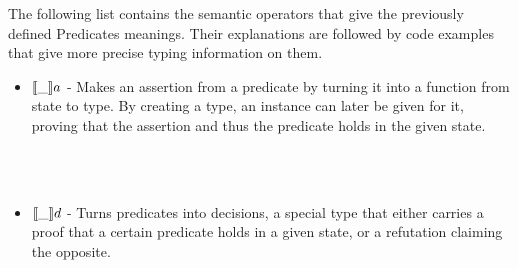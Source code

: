 The following list contains the semantic operators that give the previously defined Predicates meanings. Their explanations are followed by code examples that give more precise typing information on them.
\begin{itemize}
    \item $\llbracket \_ \rrbracket a$ - Makes an assertion from a predicate by turning it into a function from state to type. By creating a type, an instance can later be given for it, proving that the assertion and thus the predicate holds in the given state.
    \begin{code}
        \>[2]\AgdaSpace{}%
        \AgdaSymbol{:}\AgdaSpace{}%
        \<%
        \\
        \>[2]\AgdaSpace{}%
        \AgdaSymbol{=}\AgdaSpace{}%
        \AgdaSpace{}%
        \AgdaSpace{}%
        \<%
        \\
        \>[2]\AgdaSpace{}%
        \AgdaSymbol{:}\AgdaSpace{}%
        \AgdaSpace{}%
        \AgdaSpace{}%
        \<%
    \end{code}

    \item $\llbracket \_ \rrbracket d$ - Turns predicates into decisions, a special type that either carries a proof that a certain predicate holds in a given state, or a refutation claiming the opposite.
    \begin{code}
        \>[2]\AgdaSpace{}%
        \AgdaSymbol{:}\AgdaSpace{}%
        \AgdaSpace{}%
        \AgdaSpace{}%
        \<%
        \\
        \>[2]\AgdaSpace{}%
        \AgdaSpace{}%
        \AgdaSymbol{=}\AgdaSpace{}%
        \AgdaSymbol{(}\AgdaSpace{}%
        \AgdaSymbol{:}\AgdaSpace{}%
        \AgdaSymbol{)}\AgdaSpace{}%
        \AgdaSpace{}%
        \AgdaSpace{}%
        \AgdaSymbol{(}\AgdaSpace{}%
        \AgdaSpace{}%
        \AgdaSpace{}%
        \AgdaSymbol{)}\<%
        \\
        \>[2]\AgdaSpace{}%
        \AgdaSymbol{:}\AgdaSpace{}%
        \AgdaSymbol{(}\AgdaSpace{}%
        \AgdaSymbol{:}\AgdaSpace{}%
        \AgdaSymbol{)}\AgdaSpace{}%
        \AgdaSpace{}%
        \AgdaSpace{}%
        \<%
    \end{code}


\end{itemize}
